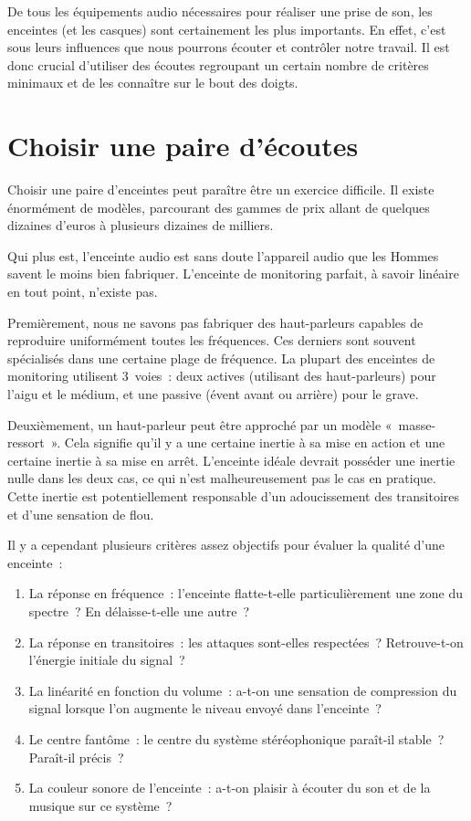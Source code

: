 \documentclass[
]{book}
\providecommand{\tightlist}{%
  \setlength{\itemsep}{0pt}\setlength{\parskip}{0pt}}
\begin{document}
De tous les équipements audio nécessaires pour réaliser une prise de son, les enceintes (et les casques) sont certainement les plus importants. En effet, c'est sous leurs influences que nous pourrons écouter et contrôler notre travail. Il est donc crucial d'utiliser des écoutes regroupant un certain nombre de critères minimaux et de les connaître sur le bout des doigts.

\hypertarget{choisir-une-paire-duxe9coutes}{%
\section{Choisir une paire d'écoutes}\label{choisir-une-paire-duxe9coutes}}

Choisir une paire d'enceintes peut paraître être un exercice difficile. Il existe énormément de modèles, parcourant des gammes de prix allant de quelques dizaines d'euros à plusieurs dizaines de milliers.

Qui plus est, l'enceinte audio est sans doute l'appareil audio que les Hommes savent le moins bien fabriquer. L'enceinte de monitoring parfait, à savoir linéaire en tout point, n'existe pas.

Premièrement, nous ne savons pas fabriquer des haut-parleurs capables de reproduire uniformément toutes les fréquences. Ces derniers sont souvent spécialisés dans une certaine plage de fréquence. La plupart des enceintes de monitoring utilisent 3~voies~: deux actives (utilisant des haut-parleurs) pour l'aigu et le médium, et une passive (évent avant ou arrière) pour le grave.

Deuxièmement, un haut-parleur peut être approché par un modèle «~masse-ressort~». Cela signifie qu'il y a une certaine inertie à sa mise en action et une certaine inertie à sa mise en arrêt. L'enceinte idéale devrait posséder une inertie nulle dans les deux cas, ce qui n'est malheureusement pas le cas en pratique. Cette inertie est potentiellement responsable d'un adoucissement des transitoires et d'une sensation de flou.

Il y a cependant plusieurs critères assez objectifs pour évaluer la qualité d'une enceinte~:

\begin{enumerate}
\def\labelenumi{\arabic{enumi}.}
\tightlist
\item
  La réponse en fréquence~: l'enceinte flatte-t-elle particulièrement une zone du spectre~? En délaisse-t-elle une autre~?
\item
  La réponse en transitoires~: les attaques sont-elles respectées~? Retrouve-t-on l'énergie initiale du signal~?
\item
  La linéarité en fonction du volume~: a-t-on une sensation de compression du signal lorsque l'on augmente le niveau envoyé dans l'enceinte~?
\item
  Le centre fantôme~: le centre du système stéréophonique paraît-il stable~? Paraît-il précis~?
\item
  La couleur sonore de l'enceinte~: a-t-on plaisir à écouter du son et de la musique sur ce système~?
\end{enumerate}
\end{document}
